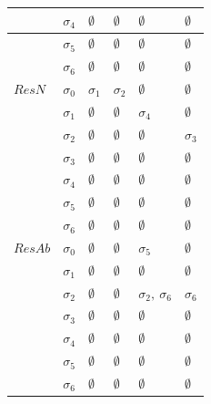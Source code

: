 \documentclass[11pt,a4paper]{article}
\begin{document}
\begin{table}[]
\begin{tabular}{|l|l|l|l|l|l|}
     & $\sigma_4$ &  $\emptyset$  & $\emptyset$ & $\emptyset$   &  $\emptyset$  \\ \hline
     & $\sigma_5$ &  $\emptyset$  & $\emptyset$ & $\emptyset$   &  $\emptyset$  \\ \hline
     & $\sigma_6$ &  $\emptyset$  & $\emptyset$ & $\emptyset$   &  $\emptyset$  \\ \hline
$ResN$ & $\sigma_0$ &  $\sigma_1$ & $\sigma_2$ & $\emptyset$ & $\emptyset$   \\ \hline
     & $\sigma_1$ &  $\emptyset$  & $\emptyset$ & $\sigma_4$   &  $\emptyset$  \\ \hline
     & $\sigma_2$ &  $\emptyset$  & $\emptyset$ & $\emptyset$   &  $\sigma_3$  \\ \hline
     & $\sigma_3$ &  $\emptyset$  & $\emptyset$ & $\emptyset$   &  $\emptyset$  \\ \hline
     & $\sigma_4$ &  $\emptyset$  & $\emptyset$ & $\emptyset$   &  $\emptyset$  \\ \hline
     & $\sigma_5$ &  $\emptyset$  & $\emptyset$ & $\emptyset$   &  $\emptyset$  \\ \hline
     & $\sigma_6$ &  $\emptyset$  & $\emptyset$ & $\emptyset$   &  $\emptyset$  \\ \hline
 $ResAb$ & $\sigma_0$ &  $\emptyset$ & $\emptyset$ & $\sigma_5$ & $\emptyset$   \\ \hline
     & $\sigma_1$ &  $\emptyset$  & $\emptyset$ & $\emptyset$   &  $\emptyset$  \\ \hline
     & $\sigma_2$ &  $\emptyset$  & $\emptyset$ & $\sigma_2,~\sigma_6$   &  $\sigma_6$  \\ \hline
     & $\sigma_3$ &  $\emptyset$  & $\emptyset$ & $\emptyset$   &  $\emptyset$  \\ \hline
     & $\sigma_4$ &  $\emptyset$  & $\emptyset$ & $\emptyset$   &  $\emptyset$  \\ \hline
     & $\sigma_5$ &  $\emptyset$  & $\emptyset$ & $\emptyset$   &  $\emptyset$  \\ \hline
     & $\sigma_6$ &  $\emptyset$  & $\emptyset$ & $\emptyset$   &  $\emptyset$  \\ \hline          
\end{tabular}
\end{table}
\end{document}
